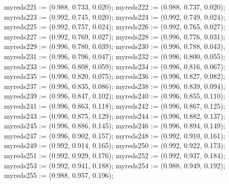 myreds221 := (0.988, 0.733, 0.020);
myreds222 := (0.988, 0.737, 0.020);
myreds223 := (0.992, 0.745, 0.020);
myreds224 := (0.992, 0.749, 0.024);
myreds225 := (0.992, 0.757, 0.024);
myreds226 := (0.992, 0.765, 0.027);
myreds227 := (0.992, 0.769, 0.027);
myreds228 := (0.996, 0.776, 0.031);
myreds229 := (0.996, 0.780, 0.039);
myreds230 := (0.996, 0.788, 0.043);
myreds231 := (0.996, 0.796, 0.047);
myreds232 := (0.996, 0.800, 0.055);
myreds233 := (0.996, 0.808, 0.059);
myreds234 := (0.996, 0.816, 0.067);
myreds235 := (0.996, 0.820, 0.075);
myreds236 := (0.996, 0.827, 0.082);
myreds237 := (0.996, 0.835, 0.086);
myreds238 := (0.996, 0.839, 0.094);
myreds239 := (0.996, 0.847, 0.102);
myreds240 := (0.996, 0.855, 0.110);
myreds241 := (0.996, 0.863, 0.118);
myreds242 := (0.996, 0.867, 0.125);
myreds243 := (0.996, 0.875, 0.129);
myreds244 := (0.996, 0.882, 0.137);
myreds245 := (0.996, 0.886, 0.145);
myreds246 := (0.996, 0.894, 0.149);
myreds247 := (0.996, 0.902, 0.157);
myreds248 := (0.992, 0.910, 0.161);
myreds249 := (0.992, 0.914, 0.165);
myreds250 := (0.992, 0.922, 0.173);
myreds251 := (0.992, 0.929, 0.176);
myreds252 := (0.992, 0.937, 0.184);
myreds253 := (0.992, 0.941, 0.188);
myreds254 := (0.988, 0.949, 0.192);
myreds255 := (0.988, 0.957, 0.196);
